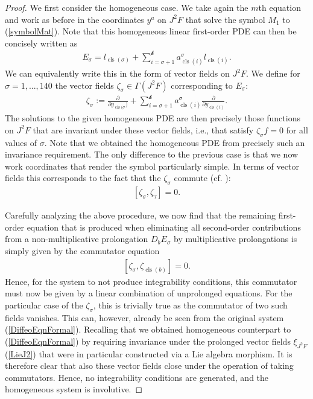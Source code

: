 \begin{proof}
We first consider the homogeneous case. We take again the $m$th equation and work as before in the coordinates $y^a$ on $J^2F$ that solve the symbol $M_1$ to (\ref{symbolMat}). Note that this homogeneous linear first-order PDE can then be concisely written as
\begin{align}
    E_{\sigma} = l_{\operatorname{cls}(\sigma)} + \sum_{i = \sigma+1}^{\mathcal{k}} a^{\sigma}_{\operatorname{cls}(i)} l_{\operatorname{cls}(i) } .
\end{align}
We can equivalently write this in the form of vector fields on $J^2F$. We define for $\sigma = 1,...,140$ the vector fields $\zeta_{\sigma} \in \Gamma(J^2F) $ corresponding to $E_{\sigma}$:
\begin{align}
    \zeta_{\sigma} := \frac{\partial}{\partial y_{\operatorname{cls}(\sigma})} + \sum_{i = \sigma+1}^{\mathcal{k}} a^{\sigma}_{\operatorname{cls}(i)} \frac{\partial}{\partial y_{\operatorname{cls}(i)}}.
\end{align}
The solutions to the given homogeneous PDE are then precisely those functions on $J^2F$ that are invariant under these vector fields, i.e., that satisfy $\zeta_{\sigma} f = 0$ for all values of $\sigma$.
Note that we obtained the homogeneous PDE from precisely such an invariance requirement. The only difference to the previous case is that we now work coordinates that render the symbol particularly simple. 
In terms of vector fields this corresponds to the fact that the $\zeta_{\sigma}$ commute (cf. \cite{seiler1994analysis}):
\begin{align}
    \left [ \zeta_{\sigma}, \zeta_{\tau}\right ] =0.
\end{align}

Carefully analyzing the above procedure, we now find that the remaining first-order equation that is produced when eliminating all second-order contributions from a non-multiplicative prolongation $D_bE_{\sigma}$ by multiplicative prolongations is simply given by the commutator equation
\begin{align}
    \left [\zeta_{\sigma}, \zeta_{\operatorname{cls}(b)} \right] = 0.
\end{align}
Hence, for the system to not produce integrability conditions, this commutator must now be given by a linear combination of unprolonged equations. For the particular case of the $\zeta_{\sigma}$, this is trivially true as the commutator of two such fields vanishes. This can, however, already be seen from the original system (\ref{DiffeoEqnFormal}).
Recalling that we obtained homogeneous counterpart to (\ref{DiffeoEqnFormal}) by requiring invariance under the prolonged vector fields $\xi_{J^2F}$ (\ref{LieJ2}) that were in particular constructed via a Lie algebra morphism. It is therefore clear that also these vector fields close under the operation of taking commutators. Hence, no integrability conditions are generated, and the homogeneous system is involutive.


\end{proof}
